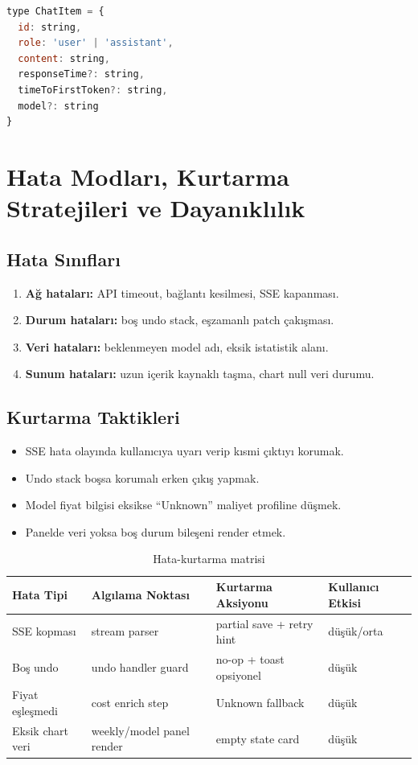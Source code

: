 \documentclass[12pt,a4paper]{article}
\begin{document}
\begin{lstlisting}[language=JavaScript, caption=Sohbet mesaji meta kontrati]
type ChatItem = {
  id: string,
  role: 'user' | 'assistant',
  content: string,
  responseTime?: string,
  timeToFirstToken?: string,
  model?: string
}
\end{lstlisting}

\section{Hata Modları, Kurtarma Stratejileri ve Dayanıklılık}

\subsection{Hata Sınıfları}
\begin{enumerate}[leftmargin=*]
  \item \textbf{Ağ hataları:} API timeout, bağlantı kesilmesi, SSE kapanması.
  \item \textbf{Durum hataları:} boş undo stack, eşzamanlı patch çakışması.
  \item \textbf{Veri hataları:} beklenmeyen model adı, eksik istatistik alanı.
  \item \textbf{Sunum hataları:} uzun içerik kaynaklı taşma, chart null veri durumu.
\end{enumerate}

\subsection{Kurtarma Taktikleri}
\begin{itemize}[leftmargin=*]
  \item SSE hata olayında kullanıcıya uyarı verip kısmi çıktıyı korumak.
  \item Undo stack boşsa korumalı erken çıkış yapmak.
  \item Model fiyat bilgisi eksikse ``Unknown'' maliyet profiline düşmek.
  \item Panelde veri yoksa boş durum bileşeni render etmek.
\end{itemize}

\begin{table}[h!]
  \centering\small
  \begin{tabular}{@{} P{2.6cm} P{3.4cm} P{3.4cm} P{2.8cm} @{}}
    \toprule
    Hata Tipi & Algılama Noktası & Kurtarma Aksiyonu & Kullanıcı Etkisi \\
    \midrule
    SSE kopması & stream parser & partial save + retry hint & düşük/orta \\
    Boş undo & undo handler guard & no-op + toast opsiyonel & düşük \\
    Fiyat eşleşmedi & cost enrich step & Unknown fallback & düşük \\
    Eksik chart veri & weekly/model panel render & empty state card & düşük \\
    \bottomrule
  \end{tabular}
  \caption{Hata-kurtarma matrisi}
\end{table}
\end{document}
